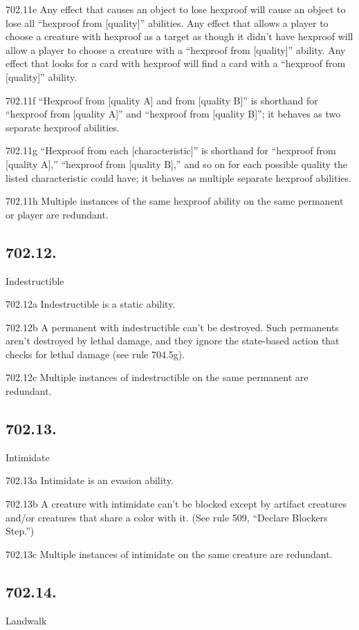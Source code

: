 702.11e Any effect that causes an object to lose hexproof will cause an object to lose all “hexproof from [quality]” abilities. Any effect that allows a player to choose a creature with hexproof as a target as though it didn’t have hexproof will allow a player to choose a creature with a “hexproof from [quality]” ability. Any effect that looks for a card with hexproof will find a card with a “hexproof from [quality]” ability.

702.11f “Hexproof from [quality A] and from [quality B]” is shorthand for “hexproof from [quality A]” and “hexproof from [quality B]”; it behaves as two separate hexproof abilities.

702.11g “Hexproof from each [characteristic]” is shorthand for “hexproof from [quality A],” “hexproof from [quality B],” and so on for each possible quality the listed characteristic could have; it behaves as multiple separate hexproof abilities.

702.11h Multiple instances of the same hexproof ability on the same permanent or player are redundant.

\subsection*{702.12.}
Indestructible

702.12a Indestructible is a static ability.

702.12b A permanent with indestructible can’t be destroyed. Such permanents aren’t destroyed by lethal damage, and they ignore the state-based action that checks for lethal damage (see rule 704.5g).

702.12c Multiple instances of indestructible on the same permanent are redundant.

\subsection*{702.13.}
Intimidate

702.13a Intimidate is an evasion ability.

702.13b A creature with intimidate can’t be blocked except by artifact creatures and/or creatures that share a color with it. (See rule 509, “Declare Blockers Step.”)

702.13c Multiple instances of intimidate on the same creature are redundant.

\subsection*{702.14.}
Landwalk

